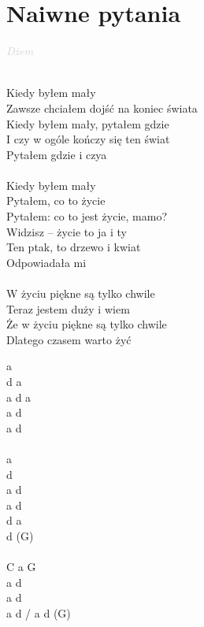 \documentclass[a5paper, 10pt]{book}
\begin{document}
\section{Naiwne pytania}\textcolor{lightgray}{\textit{Dżem}}\\~\\
\begin{minipage}[t]{0.8\textwidth}
Kiedy byłem mały\\
Zawsze chciałem dojść na koniec świata\\
Kiedy byłem mały, pytałem gdzie\\
I czy w ogóle kończy się ten świat\\
Pytałem gdzie i czya\\
\\
Kiedy byłem mały\\
Pytałem, co to życie\\
Pytałem: co to jest życie, mamo?\\
Widzisz – życie to ja i ty\\
Ten ptak, to drzewo i kwiat\\
Odpowiadała mi\\
\\
\hspace*{5mm}W życiu piękne są tylko chwile\\

Teraz jestem duży i wiem\\
Że w życiu piękne są tylko chwile\\
Dlatego czasem warto żyć\\
\end{minipage}
\begin{minipage}[t]{0.2\textwidth}
a\\
d a\\
a d a\\
a d\\
a d\\
\\
a\\
d\\
a d\\
a d\\
d a\\
d (G)\\
\\
C a G\\

a d\\
a d\\
a d / a d (G)\\
\end{minipage}
\end{document}
